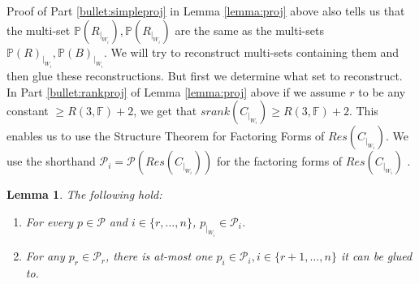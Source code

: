 \documentclass[12pt]{caltech_thesis}
\theoremstyle{plain}
\newtheorem{lemma}{Lemma}
\theoremstyle{definition}
\newcommand{\F}{\mathbb{F}}
\newcommand{\MP}{\mathcal{P}}
\newcommand{\PP}{\mathbb{P}}
\begin{document}
Proof of Part \ref{bullet:simpleproj} in Lemma \ref{lemma:proj} above also tells us that the multi-set 
$\PP(R_{|_{W_i}}), \PP(R_{|_{W_i}}) $ are the same as the multi-sets $\PP(R)_{|_{W_i}}, \PP(B)_{|_{W_i}}$. We will
try to reconstruct multi-sets containing them and then glue these reconstructions. But first we determine what set to reconstruct.
In Part \ref{bullet:rankproj} of Lemma \ref{lemma:proj} above if we assume $r$ to be any constant $\geq R(3,\F) +2$, we get that
$srank(C_{|_{W_i}}) \geq R(3,\F)+2$. This enables us to use the Structure Theorem for Factoring Forms of $Res(C_{|_{W_i}})$.
We use the shorthand $\MP_i = \MP(Res(C_{|_{W_i}}))$ for the factoring forms of $Res(C_{|_{W_i}})$ . 



\begin{lemma}\label{lemma:requirementsproof}
 The following hold:
 \begin{enumerate}
\item \label{bullet:part1proof} For every $p\in \MP$ and $i\in \{r,\ldots,n\}$, $p_{|_{W_i}} \in \MP_i$.
 \item \label{bullet:part2proof} For any $p_r\in \MP_r$, there is at-most one $p_i\in \MP_i, i\in \{r+1,\ldots,n\}$ it can be glued to.
\end{enumerate}
\end{lemma}
\end{document}

